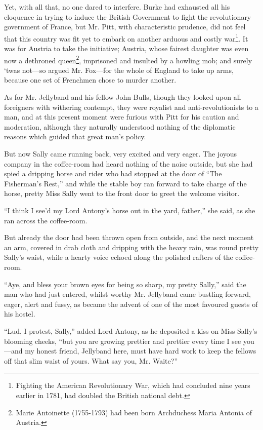 \documentclass[paper=5.5in:8.5in,BCOR=7mm,twoside,DIV=calc,12pt,usegeometry,chapterprefix,endperiod,headings=big]{scrbook}
\begin{document}
Yet, with all that, no one dared to interfere. Burke had exhausted all his eloquence in trying to induce the British Government to fight the revolutionary government of France, but Mr. Pitt, with characteristic prudence, did not feel that this country was fit yet to embark on another arduous and costly war\footnote{Fighting the American Revolutionary War, which had concluded nine years earlier in 1781, had doubled the British national debt.}. It was for Austria to take the initiative; Austria, whose fairest daughter was even now a dethroned queen\footnote{Marie Antoinette (1755-1793) had been born Archduchess Maria Antonia of Austria.}, imprisoned and insulted by a howling mob; and surely `twas not---so argued Mr. Fox---for the whole of England to take up arms, because one set of Frenchmen chose to murder another.

As for Mr. Jellyband and his fellow John Bulls, though they looked upon all foreigners with withering contempt, they were royalist and anti-revolutionists to a man, and at this present moment were furious with Pitt for his caution and moderation, although they naturally understood nothing of the diplomatic reasons which guided that great man's policy.

But now Sally came running back, very excited and very eager. The joyous company in the coffee-room had heard nothing of the noise outside, but she had spied a dripping horse and rider who had stopped at the door of \enquote{The Fisherman's Rest,} and while the stable boy ran forward to take charge of the horse, pretty Miss Sally went to the front door to greet the welcome visitor.

\enquote{I think I see'd my Lord Antony's horse out in the yard, father,} she said, as she ran across the coffee-room.

But already the door had been thrown open from outside, and the next moment an arm, covered in drab cloth and dripping with the heavy rain, was round pretty Sally's waist, while a hearty voice echoed along the polished rafters of the coffee-room.

\enquote{Aye, and bless your brown eyes for being so sharp, my pretty Sally,} said the man who had just entered, whilst worthy Mr. Jellyband came bustling forward, eager, alert and fussy, as became the advent of one of the most favoured guests of his hostel.

\enquote{Lud, I protest, Sally,} added Lord Antony, as he deposited a kiss on Miss Sally's blooming cheeks, \enquote{but you are growing prettier and prettier every time I see you---and my honest friend, Jellyband here, must have hard work to keep the fellows off that slim waist of yours. What say you, Mr. Waite?}
\end{document}
